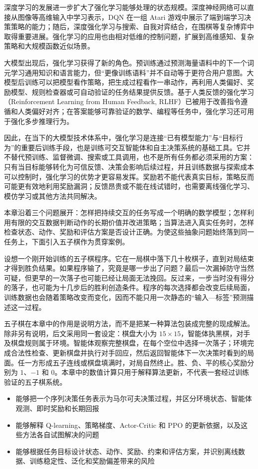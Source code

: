 \documentclass[UTF8,a4paper,zihao=-4,oneside,openany]{ctexbook}
\begin{document}
深度学习的发展进一步扩大了强化学习能够处理的状态规模。深度神经网络可以直接从图像等高维输入中学习表示，DQN 在一组 Atari 游戏中展示了端到端学习决策策略的能力；随后，深度强化学习与搜索、自我对弈结合，在围棋等复杂博弈中取得重要进展。强化学习的应用也由相对低维的控制问题，扩展到高维感知、复杂策略和大规模函数近似场景。

大模型出现后，强化学习获得了新的角色。预训练通过预测海量语料中的下一个词元学习通用知识和语言能力，但“更像训练语料”并不自动等于更符合用户意图。大模型后训练可以把模型看作策略，把生成过程看作一串动作，再利用人类偏好、奖励模型、规则检查器或可自动验证的任务结果提供反馈。基于人类反馈的强化学习（Reinforcement Learning from Human Feedback, RLHF）已被用于改善指令遵循和人类偏好对齐；在答案能够可靠验证的数学、编程等任务中，强化学习还可用于强化多步推理行为。

因此，在当下的大模型技术体系中，强化学习是连接“已有模型能力”与“目标行为”的重要后训练手段，也是训练可交互智能体和自主决策系统的基础工具。它并不替代预训练、监督微调、搜索或工具调用，也不是所有任务都必须采用的方案：只有当目标能够转化为可信反馈、决策会影响后续过程，并且训练数据与探索成本可以控制时，强化学习的优势才更容易发挥。奖励若不能代表真实目标，策略反而可能更有效地利用奖励漏洞；反馈昂贵或不能在线试错时，也需要离线强化学习、模仿学习或其他方法共同解决。

本章沿着三个问题展开：怎样把持续交互的任务写成一个明确的数学模型；怎样利用有限的交互数据判断动作的长期价值并改进策略；当算法进入真实任务时，怎样检查状态、动作、奖励和评估方案是否设计正确。为使这些抽象问题始终落到同一任务上，下面引入五子棋作为贯穿案例。

设想一个刚开始训练的五子棋程序。它在一局棋中落下几十枚棋子，直到对局结束才得到胜负结果。如果程序输了，究竟是哪一步出了问题？最后一次漏掉防守当然可疑，但更早的一次落子也可能已经让局面无法挽回。反过来，一步当时没有得分的落子，也可能为十几步后的胜利创造条件。程序的每次选择都会改变后续局面，训练数据也会随着策略改变而变化，因而不能只用一次静态的“输入—标签”预测描述这一过程。

五子棋在本章中的作用是说明方法，而不是把某一种算法包装成完整的现成解法。除非另有说明，后文采用同一套设定：棋盘大小为 $15\times15$，智能体执黑棋，对手及棋盘规则属于环境。智能体观察完整棋盘，在每个空位中选择一次落子；环境完成合法性检查、更新棋盘并执行对手回应，然后返回智能体下一次决策时看到的局面。任一方形成五子连线或棋盘填满时，对局自然终止。胜、负、平的核心奖励分别为 $1$、$-1$ 和 $0$。本章中的数值计算只用于解释算法更新，不代表一套经过训练验证的五子棋系统。

\begin{learninggoals}
  \begin{itemize}
    \item 能够把一个序列决策任务表示为马尔可夫决策过程，并区分环境状态、智能体观测、即时奖励和长期回报
    \item 能够解释 Q-learning、策略梯度、Actor-Critic 和 PPO 的更新依据，以及这些方法各自试图解决的问题
    \item 能够根据任务目标设计状态、动作、奖励、约束和评估方案，并识别离线数据、训练稳定性、泛化和奖励偏差带来的风险
  \end{itemize}
\end{learninggoals}
\end{document}
